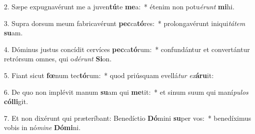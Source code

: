 2. Sæpe expugnavérunt me a juven\textbf{tú}te \textbf{me}a:~*  étenim non potu\textit{é}\textit{runt} \textbf{mi}hi.\

3. Supra dorsum meum fabricavérunt \textbf{pec}ca\textbf{tó}res:~*  prolongavérunt iniqui\textit{tá}\textit{tem} \textbf{su}am.\

4. Dóminus justus concídit cervíces \textbf{pec}ca\textbf{tó}rum:~*  confundántur et convertántur retrórsum omnes, qui o\textit{dé}\textit{runt} \textbf{Si}on.\

5. Fiant sicut \textbf{fœ}num tec\textbf{tó}rum:~*  quod priúsquam evellá\textit{tur} \textit{ex}\textbf{á}\textbf{ru}it:\

6. De quo non implévit manum \textbf{su}am qui \textbf{me}tit:~*  et sinum suum qui maní\textit{pu}\textit{los} \textbf{cól}\textbf{li}git.\

7. Et non dixérunt qui præteríbant: Benedíctio \textbf{Dó}mini \textbf{su}per vos:~*  benedíximus vobis in nó\textit{mi}\textit{ne} \textbf{Dó}\textbf{mi}ni.\

